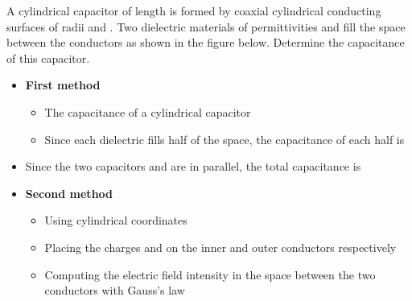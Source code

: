 \begin{ELexample}{}

A cylindrical capacitor of length  is formed by coaxial cylindrical conducting surfaces of radii  and . Two dielectric materials of permittivities  and  fill the space between the conductors as shown in the figure below. Determine the capacitance of this capacitor.


\begin{ELsolution}

\begin{itemize}
\tightlist
\item
  \textbf{First method}

  \begin{itemize}
  \tightlist
  \item
    The capacitance of a cylindrical capacitor \ELim{\ELto} 
  \item
    Since each dielectric fills half of the space, the capacitance of each half is
  \end{itemize}
\end{itemize}


\begin{itemize}
\tightlist
\item
  Since the two capacitors  and  are in parallel, the total capacitance is
\end{itemize}


\begin{itemize}
\tightlist
\item
  \textbf{Second method}

  \begin{itemize}
  \tightlist
  \item
    Using cylindrical coordinates
  \item
    Placing the charges  and  on the inner and outer conductors respectively
  \item
    Computing the electric field intensity in the space between the two conductors with Gauss's law
  \end{itemize}
\end{itemize}


\end{ELsolution}
\end{ELexample}
